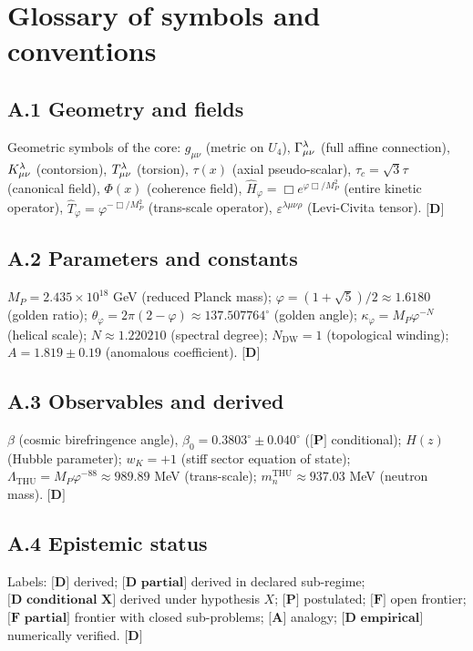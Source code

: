 ﻿\documentclass[11pt,letterpaper]{article}
\begin{document}
\section{Glossary of symbols and conventions}
\subsection{A.1 Geometry and fields}
Geometric symbols of the core: $g_{\mu\nu}$ (metric on $U_4$), $\Gamma^\lambda_{\\ \mu\nu}$ (full affine connection), $K^\lambda_{\\ \mu\nu}$ (contorsion), $T^\lambda_{\\ \mu\nu}$ (torsion), $\tau(x)$ (axial pseudo-scalar), $\tau_c = \sqrt{3}\tau$ (canonical field), $\Phi(x)$ (coherence field), $\hat{H}_\varphi = \Box e^{\varphi\Box/M_P^2}$ (entire kinetic operator), $\hat{T}_\varphi = \varphi^{-\Box/M_P^2}$ (trans-scale operator), $\varepsilon^{\lambda\mu\nu\rho}$ (Levi-Civita tensor). $\textbf{[D]}$
\subsection{A.2 Parameters and constants}
$M_P = 2{.}435 \times 10^{18}$ GeV (reduced Planck mass); $\varphi = (1+\sqrt{5})/2 \approx 1{.}6180$ (golden ratio); $\theta_\varphi = 2\pi(2-\varphi) \approx 137{.}507764^\circ$ (golden angle); $\kappa_\varphi = M_P\varphi^{-N}$ (helical scale); $N \approx 1{.}220210$ (spectral degree); $N_{\mathrm{DW}} = 1$ (topological winding); $A = 1{.}819 \pm 0{.}19$ (anomalous coefficient). $\textbf{[D]}$
\subsection{A.3 Observables and derived}
$\beta$ (cosmic birefringence angle), $\beta_0 = 0{.}3803^\circ \pm 0{.}040^\circ$ ($\textbf{[P]}$ conditional); $H(z)$ (Hubble parameter); $w_K = +1$ (stiff sector equation of state); $\Lambda_{\mathrm{THU}} = M_P\varphi^{-88} \approx 989{.}89$ MeV (trans-scale); $m_n^{\mathrm{THU}} \approx 937{.}03$ MeV (neutron mass). $\textbf{[D]}$
\subsection{A.4 Epistemic status}
Labels: $\textbf{[D]}$ derived; $\textbf{[D partial]}$ derived in declared sub-regime; $\textbf{[D conditional X]}$ derived under hypothesis $X$; $\textbf{[P]}$ postulated; $\textbf{[F]}$ open frontier; $\textbf{[F partial]}$ frontier with closed sub-problems; $\textbf{[A]}$ analogy; $\textbf{[D empirical]}$ numerically verified. $\textbf{[D]}$
\end{document}
